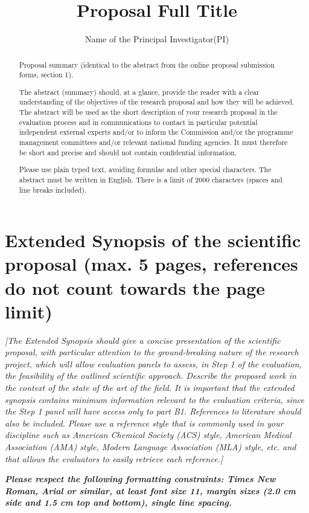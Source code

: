 \documentclass{article}
\title{Proposal Full Title}
\author[Last]{Name of the Principal Investigator(PI)}
\begin{document}
\maketitle

\begin{abstract}
	Proposal summary (identical to the abstract from the online proposal submission forms, section 1). 

	The abstract (summary) should, at a glance, provide the reader with a clear understanding of the objectives of the research proposal and how they will be achieved. The abstract will be used as the short description of your research proposal in the evaluation process and in communications to contact in particular potential independent external experts and/or to inform the Commission and/or the programme management committees and/or relevant national funding agencies. It must therefore be short and precise and should not contain confidential information. 

	Please use plain typed text, avoiding formulae and other special characters. The abstract must be written in English. There is a limit of 2000 characters (spaces and line breaks included).
\end{abstract}

\section{Extended Synopsis of the scientific proposal (max. 5 pages, references do not count towards the page limit)}

\textit{[The Extended Synopsis should give a concise presentation of the scientific proposal, with particular attention to the ground-breaking nature of the research project, which will allow evaluation panels to assess, in Step 1 of the evaluation, the feasibility of the outlined scientific approach. Describe the proposed work in the context of the state of the art of the field. It is important that the extended synopsis contains minimum information relevant to the evaluation criteria, since the Step 1 panel will have access only to part B1. 
References to literature should also be included. Please use a reference style that is commonly used in your discipline such as American Chemical Society (ACS) style, American Medical Association (AMA) style, Modern Language Association (MLA) style, etc. and that allows the evaluators to easily retrieve each reference.]}

\textit{\textbf{Please respect the following formatting constraints: Times New Roman, Arial or similar, at least font size 11, margin sizes (2.0 cm side and 1.5 cm top and bottom), single line spacing.}}
\end{document}

